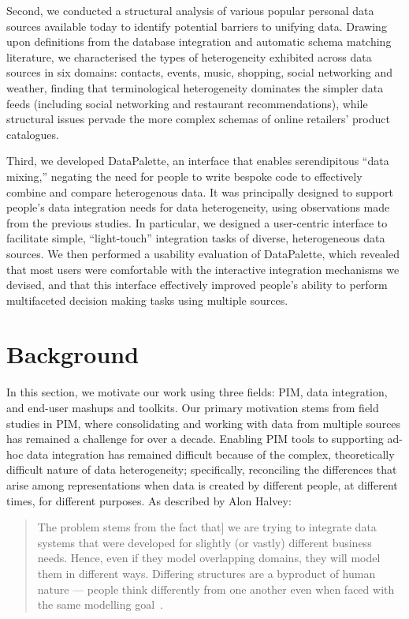 \documentclass{sigchi}
\begin{document}
Second, we conducted a structural analysis of various popular personal data sources available today to identify potential barriers to unifying data.  Drawing upon definitions from the database integration and automatic schema matching literature, we characterised the types of heterogeneity exhibited across data sources in six domains: contacts, events, music, shopping, social networking and weather, finding that terminological heterogeneity dominates the simpler data feeds (including social networking and restaurant recommendations), while structural issues pervade the more complex schemas of online retailers' product catalogues.


Third, we developed DataPalette, an interface that enables serendipitous ``data mixing,'' negating the need for people to write bespoke code to effectively combine and compare heterogenous data.  It was principally designed to support people's data integration needs for data heterogeneity, using observations made from the previous studies.  In particular, we designed a user-centric interface to facilitate simple, ``light-touch'' integration tasks of diverse, heterogeneous data sources.  We then performed a usability evaluation of DataPalette, which revealed that most users were comfortable with the interactive integration mechanisms we devised, and that this interface effectively improved people's ability to perform multifaceted decision making tasks using multiple sources.

\section{Background}

In this section, we motivate our work using three fields: PIM, data integration, and end-user mashups and toolkits.  Our primary motivation stems from field studies in PIM, where consolidating and working with data from multiple sources has remained a challenge for over a decade. Enabling PIM tools to supporting ad-hoc data integration has remained difficult because of the complex, theoretically difficult nature of data heterogeneity; specifically, reconciling the differences that arise among representations when data is created by different people, at different times, for different purposes. As described by Alon Halvey:

\begin{quote} 
  The problem stems from the fact that] we are trying to integrate data systems that were developed for slightly (or vastly) different business needs. Hence, even if they model overlapping domains, they will model them in different ways. Differing structures are a byproduct of human nature --- people think differently from one another even when faced with the same modelling goal~\cite{alonhalevy}.
\end{quote}
\end{document}
